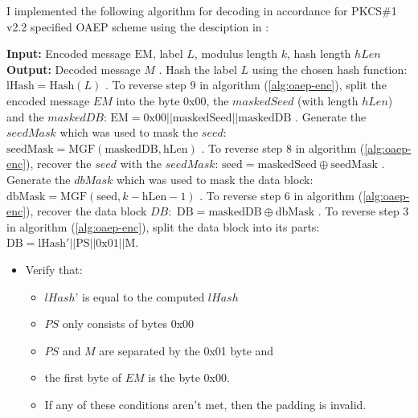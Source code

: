 \documentclass[10pt,a4paper]{article}
\begin{document}
I implemented the following algorithm for decoding in accordance for PKCS\#1 v2.2 specified OAEP scheme \cite{rfc8017} using the desciption in \cite{wiki2025}:

\begin{algorithm}
\caption{OAEP Decoding Scheme}
\begin{algorithmic}[1]
\State \textbf{Input:} Encoded message $\mathrm{EM}$, label $L$, modulus length $k$, hash length $hLen$
\State \textbf{Output:} Decoded message $M$
. Hash the label $L$ using the chosen hash function: $\mathrm{lHash} = \mathrm{Hash}(L)$
. To reverse step 9 in algorithm (\ref{alg:oaep-enc}), split the encoded message $EM$ into the byte 0x00, the $maskedSeed$ (with length $hLen$) and the $maskedDB$:  $\mathrm{EM} = \mathrm{0x00} || \mathrm{maskedSeed} || \mathrm{maskedDB}$
. Generate the $seedMask$ which was used to mask the $seed$: $\mathrm{seedMask} = \mathrm{MGF}(\mathrm{maskedDB}, \mathrm{hLen})$
. To reverse step 8 in algorithm (\ref{alg:oaep-enc}), recover the $seed$ with the $seedMask$: $\mathrm{seed} = \mathrm{maskedSeed} \oplus \mathrm{seedMask}$
. Generate the $dbMask$ which was used to mask the data block: $\mathrm{dbMask} = \mathrm{MGF}(\mathrm{seed}, k - \mathrm{hLen} - 1)$
. To reverse step 6 in algorithm (\ref{alg:oaep-enc}), recover the data block $DB:$ $\mathrm{DB} = \mathrm{maskedDB} \oplus \mathrm{dbMask}$
. To reverse step 3 in algorithm (\ref{alg:oaep-enc}), split the data block into its parts: $\mathrm{DB} = \mathrm{lHash'} || \mathrm{PS} || \mathrm{0x01} || \mathrm{M}$.

\begin{itemize}
\item  Verify that:
    \begin{itemize}
        \item  $lHash$' is equal to the computed $lHash$
        \item  $PS$ only consists of bytes 0x00
        \item  $PS$ and $M$ are separated by the 0x01 byte and
        \item  the first byte of $EM$ is the byte 0x00.
        \item  If any of these conditions aren't met, then the padding is invalid.
    \end{itemize}
\end{itemize}
\end{algorithmic}
\label{alg:oaep-dec}
\end{algorithm}
\end{document}
